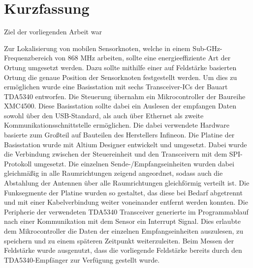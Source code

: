 
\chapter*{Kurzfassung}
\label{sec:kurzfassung}
\pagestyle{scrheadings}

Ziel der vorliegenden Arbeit war


Zur Lokalisierung von mobilen Sensorknoten, welche in einem Sub-GHz-Frequenzbereich von 868 MHz arbeiten, sollte eine energieeffiziente Art der Ortung umgesetzt werden. Dazu sollte mithilfe einer auf Feldstärke basierten Ortung die genaue Position der Sensorknoten festgestellt werden. Um dies zu ermöglichen wurde eine Basisstation mit sechs Transceiver-ICs der Bauart TDA5340 entworfen. Die Steuerung übernahm ein Mikrocontroller der Baureihe XMC4500. Diese Basisstation sollte dabei ein Auslesen der empfangen Daten  sowohl über den USB-Standard, als auch über Ethernet als zweite Kommunikationsschnittstelle ermöglichen. Die dabei verwendete Hardware basierte zum Großteil auf Bauteilen des Herstellers Infineon. 
Die Platine der Basisstation wurde mit Altium Designer entwickelt und umgesetzt. Dabei wurde die  Verbindung zwischen der Steuereinheit und den Transceivern mit dem SPI-Protokoll umgesetzt. Die einzelnen Sende-/Empfangseinheiten wurden dabei gleichmäßig in alle Raumrichtungen zeigend angeordnet, sodass auch die Abstahlung der Antennen über alle Raumrichtungen gleichförmig verteilt ist. Die Funksegmente der Platine wurden so gestaltet, das diese bei Bedarf abgetrennt und mit einer Kabelverbindung weiter voneinander entfernt werden konnten.
Die Peripherie der verwendeten TDA5340 Transceiver generierte im Programmablauf nach einer Kommunikation mit dem Sensor ein Interrupt Signal. Dies erlaubte dem Mikrocontroller die Daten der einzelnen Empfangseinheiten auszulesen, zu speichern und zu einem späteren Zeitpunkt weiterzuleiten. Beim Messen der Feldstärke wurde ausgenutzt, dass die vorliegende Feldstärke bereits durch den TDA5340-Empfänger zur Verfügung gestellt wurde.


